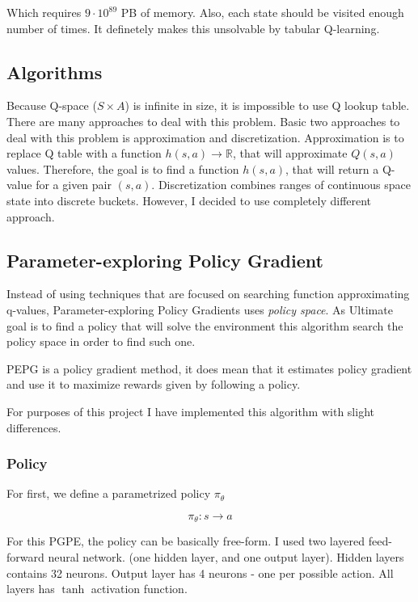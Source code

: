 \documentclass[12pt]{article}
\begin{document}
Which requires $9 \cdot 10^{89}$ PB of memory. Also, each state should be visited enough number of times. It definetely makes this unsolvable by tabular Q-learning.

\subsection{Algorithms}

Because Q-space ($S \times A$) is infinite in size, it is impossible to use Q lookup table. There are many approaches to deal with this problem. Basic two approaches to deal with this problem is approximation and discretization. Approximation is to replace Q table with a function $h(s,a) \rightarrow \mathbb{R}$, that will approximate $Q(s, a)$ values. Therefore, the goal is to find a function $h(s, a)$, that will return a Q-value for a given pair $(s,a)$. 
Discretization combines ranges of continuous space state into discrete buckets. However, I decided to use completely different approach.

\subsection{Parameter-exploring Policy Gradient}
Instead of using techniques that are focused on searching function approximating q-values, Parameter-exploring Policy Gradients\cite{pgpe} uses \emph{policy space}. As Ultimate goal is to find a policy that will solve the environment this algorithm search the policy space in order to find such one.

PEPG is a policy gradient method, it does mean that it estimates policy gradient and use it to maximize rewards given by following a policy.

For purposes of this project I have implemented this algorithm with slight differences.

\subsubsection{Policy}

For first, we define a parametrized policy $\pi_\theta$

\begin{equation}
\pi_\theta: s \rightarrow a
\end{equation}

For this PGPE, the policy can be basically free-form. I used two layered feed-forward neural network. (one hidden layer, and one output layer).
Hidden layers contains 32 neurons. Output layer has 4 neurons - one per possible action. All layers has $\tanh$ activation function.
\end{document}
